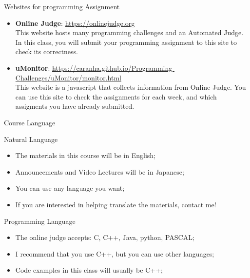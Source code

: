 \begin{frame}{Websites for programming Assignment}
  \begin{itemize}
    \item {\bf Online Judge}: \url{https://onlinejudge.org}\\
      This website hosts many programming challenges and an Automated Judge.
      In this class, you will submit your programming assignment to this
      site to check its correctness.
    \bigskip

    \item {\bf uMonitor}: \url{https://caranha.github.io/Programming-Challenges/uMonitor/monitor.html}\\
      This website is a javascript that collects information from Online Judge.
      You can use this site to check the assignments for each week, and which
      assigments you have already submitted.
  \end{itemize}
\end{frame}

\begin{frame}{Course Language}
  \begin{block}{Natural Language}
    \begin{itemize}
      \item The materials in this course will be in English;
      \item Announcements and Video Lectures will be in Japanese;
      \item You can use any language you want;
      \item If you are interested in helping translate the materials,
        contact me!
    \end{itemize}
  \end{block}

  \begin{block}{Programming Language}
    \begin{itemize}
      \item The online judge accepts: C, C++, Java, python, PASCAL;
      \item I recommend that you use C++, but you can use other languages;
      \item Code examples in this class will usually be C++;
    \end{itemize}
  \end{block}
\end{frame}

